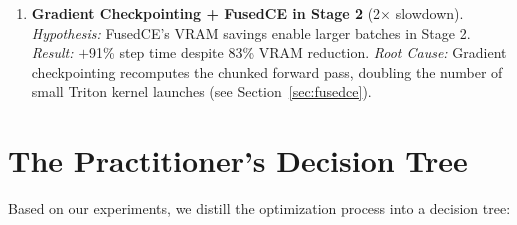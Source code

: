 \documentclass[11pt,a4paper]{article}
\begin{document}
\begin{enumerate}[leftmargin=*]
\item \textbf{Gradient Checkpointing + FusedCE in Stage 2} (2$\times$ slowdown).
  \textit{Hypothesis:} FusedCE's VRAM savings enable larger batches in Stage 2.
  \textit{Result:} $+$91\% step time despite 83\% VRAM reduction.
  \textit{Root Cause:} Gradient checkpointing recomputes the chunked forward pass, doubling
  the number of small Triton kernel launches (see Section~\ref{sec:fusedce}).

\end{enumerate}

\section{The Practitioner's Decision Tree}
\label{sec:decision}

Based on our experiments, we distill the optimization process into a decision tree:
\end{document}
